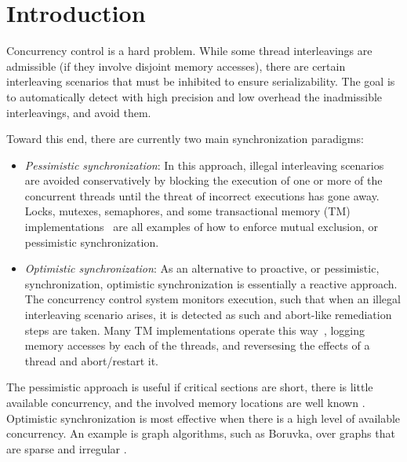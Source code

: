 \section{Introduction}\label{Se:intro}

Concurrency control is a hard problem. While some thread interleavings are admissible (if they involve disjoint memory accesses), there are certain interleaving scenarios that must be inhibited to ensure serializability. The goal is to automatically detect with high precision and low overhead the inadmissible interleavings, and avoid them.  

Toward this end, there are currently two main synchronization paradigms:
\begin{itemize}
	\item \textit{Pessimistic synchronization}: In this approach, illegal interleaving scenarios are avoided conservatively by blocking the execution of one or more of the concurrent threads until the threat of incorrect executions has gone away. Locks, mutexes, semaphores, and some transactional memory (TM) implementations~\cite{ppopp/HerlihyK08,nirpess} are all examples of how to enforce mutual exclusion, or pessimistic synchronization.
	\item \textit{Optimistic synchronization}: As an alternative to proactive, or pessimistic, synchronization, optimistic synchronization is essentially a reactive approach. The concurrency control system monitors execution, such that when an illegal interleaving scenario arises, it is detected as such and abort-like remediation steps are taken. Many TM implementations operate this way~\cite{DBLP:conf/isca/HerlihyM93}, logging memory accesses by each of the threads, and reversesing the effects of a thread and abort/restart it.
\end{itemize}

\noindent
The pessimistic approach is useful if critical sections are short, there is little available concurrency, and the involved memory locations are well known \cite{AndiKleen}. Optimistic synchronization is most effective when there is a high level of available concurrency. An example is graph algorithms, such as Boruvka, over graphs that are sparse and irregular \cite{KulkarniGalois}.
%


